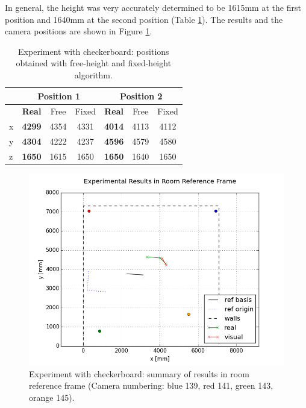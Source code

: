 In general, the height was very accurately determined to be 1615mm at the first position and 1640mm at the second position (Table \ref{tab:res2_errors}).
The results and the camera positions are shown in Figure \ref{fig:res2_room}.

\begin{table}
\begin{center}
\caption{Experiment with checkerboard: positions obtained with free-height and fixed-height algorithm.}
\begin{tabular}{lcccccc}
\toprule
    & \multicolumn{3}{c}{\textbf{Position 1}} & \multicolumn{3}{c}{\textbf{Position 2}} \\
\midrule
& \textbf{Real} & Free & Fixed & \textbf{Real} & Free & Fixed \\
x   & \textbf{4299} & 4354 & 4331 & \textbf{4014} & 4113 & 4112  \\
y   & \textbf{4304} & 4222 & 4237 & \textbf{4596} & 4579 & 4580 \\
z   & \textbf{1650} & 1615 & 1650 & \textbf{1650} & 1640 & 1650 \\
\bottomrule
\end{tabular}
\label{tab:res2_errors}
\end{center}
\end{table}

\begin{figure}
    \centering
    \includegraphics[width=\linewidth]{files/res2_room.png}
    \caption{Experiment with checkerboard: summary of results in room reference frame (Camera numbering: blue 139, red 141, green 143, orange 145).}
    \label{fig:res2_room}
\end{figure}




